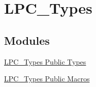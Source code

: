 \hypertarget{group___l_p_c___types}{\section{\-L\-P\-C\-\_\-\-Types}
\label{group___l_p_c___types}
}
\subsection*{\-Modules}
\begin{DoxyCompactItemize}
\item 
\hyperlink{group___l_p_c___types___public___types}{\-L\-P\-C\-\_\-\-Types Public Types}
\item 
\hyperlink{group___l_p_c___types___public___macros}{\-L\-P\-C\-\_\-\-Types Public Macros}
\end{DoxyCompactItemize}
